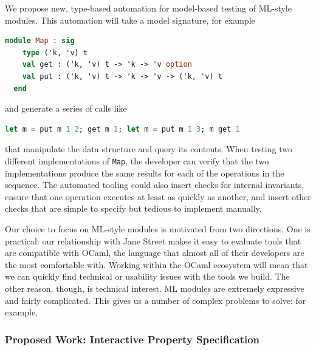 We propose new, type-based automation for model-based testing of ML-style
modules. This automation will take a model signature, for example
\begin{lstlisting}[language=Caml]
  module Map : sig
    type ('k, 'v) t
    val get : ('k, 'v) t -> 'k -> 'v option
    val put : ('k, 'v) t -> 'k -> 'v -> ('k, 'v) t
  end
\end{lstlisting}
and generate a series of calls like
\begin{lstlisting}[language=Caml]
  let m = put m 1 2; get m 1; let m = put m 1 3; m get 1
\end{lstlisting}
that manipulate the data structure and query its contents. When testing two
different implementations of \lstinline{Map}, the developer can verify that the
two implementations produce the same results for each of the operations in the
sequence. The automated tooling could also insert checks for internal
invariants, ensure that one operation executes at least as quickly as another,
and insert other checks that are simple to specify but tedious to implement
manually.

Our choice to focus on ML-style modules is motivated from two directions. One is
practical: our relationship with Jane Street makes it easy to evaluate tools
that are compatible with OCaml, the language that almost all of their developers
are the most comfortable with. Working within the OCaml ecosystem will mean that
we can quickly find technical or usability issues with the tools we build. The
other reason, though, is technical interest. ML modules are extremely
expressive and fairly complicated. This gives us a number of complex problems to
solve: for example, 


\subsubsection{Proposed Work: Interactive Property Specification}

 

